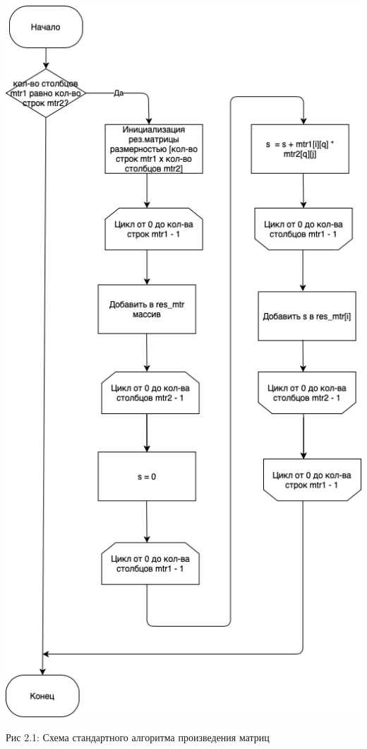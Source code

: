 \documentclass[12pt]{report}
\begin{document}
\begin{center}
		\includegraphics[scale=0.6]{schema/StandMtr.png}
		
			Рис 2.1: Схема стандартного алгоритма произведения матриц
\end{center}
\end{document}
